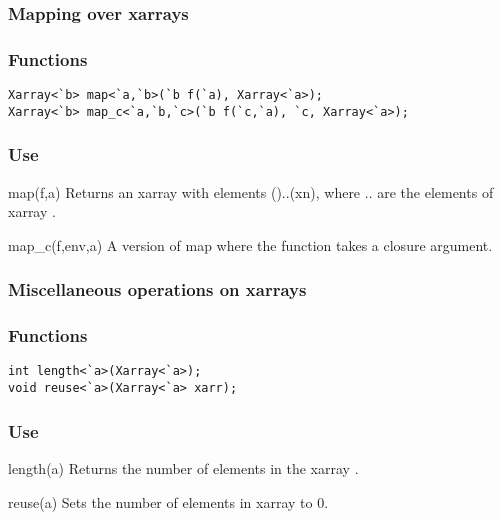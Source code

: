 \subsubsection*{Mapping over xarrays}
\subsubsection*{Functions}
\begin{verbatim}
Xarray<`b> map<`a,`b>(`b f(`a), Xarray<`a>);
Xarray<`b> map_c<`a,`b,`c>(`b f(`c,`a), `c, Xarray<`a>);
\end{verbatim}

\subsubsection*{Use}

\begin{defun}{map}{(f,a)}
Returns an xarray with elements ()..(xn), where
.. are the elements of xarray .
\end{defun}

\begin{defun}{map_c}{(f,env,a)}
A version of map where the function  takes a closure argument.
\end{defun}

\subsubsection*{Miscellaneous operations on xarrays}
\subsubsection*{Functions}
\begin{verbatim}
int length<`a>(Xarray<`a>);
void reuse<`a>(Xarray<`a> xarr);
\end{verbatim}

\subsubsection*{Use}

\begin{defun}{length}{(a)}
Returns the number of elements in the xarray .
\end{defun}

\begin{defun}{reuse}{(a)}
Sets the number of elements in xarray  to 0.
\end{defun}

